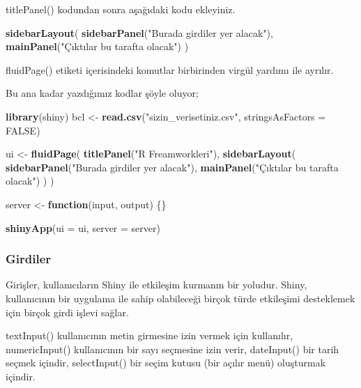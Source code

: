 \documentclass[]{book}
\newenvironment{Shaded}{\begin{snugshade}}{\end{snugshade}}
\newcommand{\KeywordTok}[1]{\textcolor[rgb]{0.13,0.29,0.53}{\textbf{#1}}}
\newcommand{\DataTypeTok}[1]{\textcolor[rgb]{0.13,0.29,0.53}{#1}}
\newcommand{\StringTok}[1]{\textcolor[rgb]{0.31,0.60,0.02}{#1}}
\newcommand{\OtherTok}[1]{\textcolor[rgb]{0.56,0.35,0.01}{#1}}
\newcommand{\ControlFlowTok}[1]{\textcolor[rgb]{0.13,0.29,0.53}{\textbf{#1}}}
\newcommand{\NormalTok}[1]{#1}
\begin{document}
titlePanel() kodundan sonra aşağıdaki kodu ekleyiniz.

\begin{Shaded}
\begin{Highlighting}[]
\KeywordTok{sidebarLayout}\NormalTok{(}
  \KeywordTok{sidebarPanel}\NormalTok{(}\StringTok{"Burada girdiler yer alacak"}\NormalTok{),}
  \KeywordTok{mainPanel}\NormalTok{(}\StringTok{"Çıktılar bu tarafta olacak"}\NormalTok{)}
\NormalTok{)}
\end{Highlighting}
\end{Shaded}

fluidPage() etiketi içerisindeki komutlar birbirinden virgül yardımı ile
ayrılır.

Bu ana kadar yazdığımız kodlar şöyle oluyor;

\begin{Shaded}
\begin{Highlighting}[]
\KeywordTok{library}\NormalTok{(shiny)}
\NormalTok{bcl <-}\StringTok{ }\KeywordTok{read.csv}\NormalTok{(}\StringTok{"sizin_verisetiniz.csv"}\NormalTok{, }\DataTypeTok{stringsAsFactors =} \OtherTok{FALSE}\NormalTok{)}

\NormalTok{ui <-}\StringTok{ }\KeywordTok{fluidPage}\NormalTok{(}
  \KeywordTok{titlePanel}\NormalTok{(}\StringTok{"R Freamworkleri"}\NormalTok{),}
  \KeywordTok{sidebarLayout}\NormalTok{(}
    \KeywordTok{sidebarPanel}\NormalTok{(}\StringTok{"Burada girdiler yer alacak"}\NormalTok{),}
    \KeywordTok{mainPanel}\NormalTok{(}\StringTok{"Çıktılar bu tarafta olacak"}\NormalTok{)}
\NormalTok{  )}
\NormalTok{)}

\NormalTok{server <-}\StringTok{ }\ControlFlowTok{function}\NormalTok{(input, output) \{\}}

\KeywordTok{shinyApp}\NormalTok{(}\DataTypeTok{ui =}\NormalTok{ ui, }\DataTypeTok{server =}\NormalTok{ server)}
\end{Highlighting}
\end{Shaded}

\subsubsection{Girdiler}\label{girdiler}

Girişler, kullanıcıların Shiny ile etkileşim kurmanın bir yoludur.
Shiny, kullanıcının bir uygulama ile sahip olabileceği birçok türde
etkileşimi desteklemek için birçok girdi işlevi sağlar.

textInput() kullanıcının metin girmesine izin vermek için kullanılır,
numericInput() kullanıcının bir sayı seçmesine izin verir, dateInput()
bir tarih seçmek içindir, selectInput() bir seçim kutusu (bir açılır
menü) oluşturmak içindir.
\end{document}

